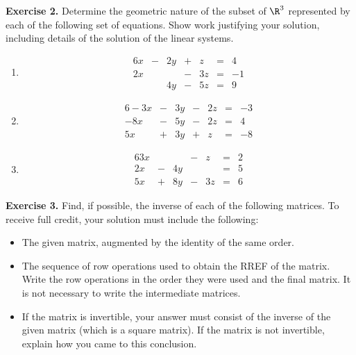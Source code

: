 \documentclass[12pt]{article}
\begin{document}
\clearpage

\textbf{Exercise 2.} Determine the geometric nature of the subset of $\R^3$ represented by each of the following set of equations. Show work justifying your solution, including details of the solution of the linear systems.

\begin{enumerate}
\item 
\begin{alignat*}{6}
x  &{}-{}& 2y &{}+{}&  z &{}={}&  4\\
2x &{}{}&     &{}-{}& 3z &{}={}& -1\\
   &{}{}&  4y &{}-{}& 5z &{}={}&  9
\end{alignat*}

\item 
\begin{alignat*}{6}
-3x &{}-{}& 3y &{}-{}& 2z &{}={}& -3\\
-8x &{}-{}& 5y &{}-{}& 2z &{}={}&  4\\
 5x &{}+{}& 3y &{}+{}&  z &{}={}& -8
\end{alignat*}

\item 
\begin{alignat*}{6}
 3x &{}{}&     &{}-{}&  z &{}={}&  2\\
 2x &{}-{}& 4y &{}{}&     &{}={}&  5\\
 5x &{}+{}& 8y &{}-{}& 3z &{}={}&  6
\end{alignat*}

\end{enumerate}

\textbf{Exercise 3.} Find, if possible, the inverse of each of the following matrices. To receive full credit, your solution must include the following:
\begin{itemize}
\item The given matrix, augmented by the identity of the same order.
\item The sequence of row operations used to obtain the RREF of the matrix. Write the row operations in the order they were used and the final matrix. It is not necessary to write the intermediate matrices.
\item If the matrix is invertible, your answer must consist of the inverse of the given matrix (which is a square matrix). If the matrix is not invertible, explain how you came to this conclusion.
\end{itemize}
\end{document}

